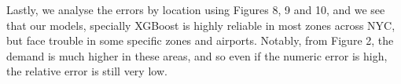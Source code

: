 \documentclass[11pt]{article}
\begin{document}
Lastly, we analyse the errors by location using Figures 8, 9 and 10, and we see that our models, specially XGBoost is highly reliable in most zones across NYC, but face trouble in some specific zones and airports. Notably, from Figure 2, the demand is much higher in these areas, and so even if the numeric error is high, the relative error is still very low.

\begin{figure}[H]
\begin{floatrow}[3]
\end{floatrow}
\end{figure}
\end{document}
